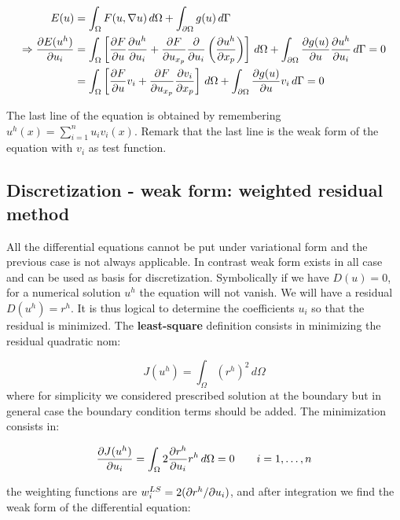 \begin{equation}
\begin{aligned}
E(u) &= \int _\Omega F(u,\nabla u) \, d\Omega + \int _{\partial \Omega} g(u) \, d\Gamma \\
\Rightarrow \frac{\partial E(u^h)}{\partial u_i} &= \int _\Omega \left[ \frac{\partial F}{\partial u}\frac{\partial u^h}{\partial u_i} + \frac{\partial F}{\partial u_{x_p}}\frac{\partial}{\partial u_i} \left( \frac{\partial u^h}{\partial x_{p}}\right) \right] \, d\Omega + \int _{\partial \Omega} \frac{\partial g(u)}{\partial u}\frac{\partial u^h}{\partial u_i} \, d\Gamma = 0\\
&= \int _\Omega \left[ \frac{\partial F}{\partial u}v _i + \frac{\partial F}{\partial u_{x_p}}\frac{\partial v _i}{\partial x_{p}} \right] \, d\Omega + \int _{\partial \Omega} \frac{\partial g(u)}{\partial u}v_i \, d\Gamma = 0
\end{aligned}
\end{equation}

The last line of the equation is obtained by remembering $u^h (x) = \sum _{i=1}^n u_i v_i (x)$. Remark that the last line is the weak form of the equation with $v_i$ as test function. 

\subsection{Discretization - weak form: weighted residual method}
All the differential equations cannot be put under variational form and the previous case is not always applicable. In contrast weak form exists in all case and can be used as basis for discretization. Symbolically if we have $D(u)= 0$, for a numerical solution $u^h$ the equation will not vanish. We will have a residual $D(u^h) = r^h$. It is thus logical to determine the coefficients $u_i$ so that the residual is minimized. The \textbf{least-square} definition consists in minimizing the residual quadratic nom: 

\begin{equation}
J(u^h) = \int _\Omega (r^h)^2 \, d\Omega
\end{equation}
 where for simplicity we considered prescribed solution at the boundary but in general case the boundary condition terms should be added. The minimization consists in: 
 
 \begin{equation}
 \frac{\partial J(u^h)}{\partial u_i} = \int _\Omega 2\frac{\partial r^h}{\partial u_i}r^h \, d\Omega = 0 \qquad i = 1,\dots , n
 \end{equation}

the weighting functions are $w_i^{LS} = 2(\partial r^h / \partial u_i)$, and after integration we find the weak form of the differential equation:

